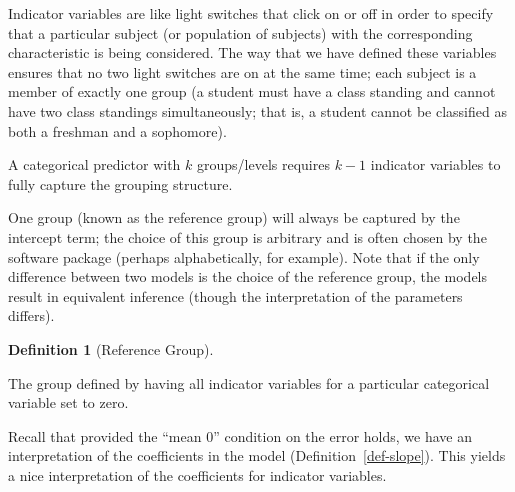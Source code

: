 \documentclass[
  letterpaper,
  DIV=11,
  numbers=noendperiod]{scrreprt}
\theoremstyle{definition}
\newtheorem{definition}{Definition}[chapter]
\theoremstyle{definition}
\theoremstyle{remark}
\begin{document}
Indicator variables are like light switches that click on or off in
order to specify that a particular subject (or population of subjects)
with the corresponding characteristic is being considered. The way that
we have defined these variables ensures that no two light switches are
on at the same time; each subject is a member of exactly one group (a
student must have a class standing and cannot have two class standings
simultaneously; that is, a student cannot be classified as both a
freshman and a sophomore).

\begin{tcolorbox}[enhanced jigsaw, left=2mm, toprule=.15mm, arc=.35mm, breakable, opacitybacktitle=0.6, opacityback=0, rightrule=.15mm, colbacktitle=quarto-callout-note-color!10!white, coltitle=black, leftrule=.75mm, toptitle=1mm, colframe=quarto-callout-note-color-frame, titlerule=0mm, title=\textcolor{quarto-callout-note-color}{\faInfo}\hspace{0.5em}{Note}, bottomrule=.15mm, colback=white, bottomtitle=1mm]

A categorical predictor with \(k\) groups/levels requires \(k-1\)
indicator variables to fully capture the grouping structure.

\end{tcolorbox}

One group (known as the reference group) will always be captured by the
intercept term; the choice of this group is arbitrary and is often
chosen by the software package (perhaps alphabetically, for example).
Note that if the only difference between two models is the choice of the
reference group, the models result in equivalent inference (though the
interpretation of the parameters differs).

\begin{definition}[Reference
Group]\protect\hypertarget{def-reference-group}{}\label{def-reference-group}

The group defined by having all indicator variables for a particular
categorical variable set to zero.

\end{definition}

Recall that provided the ``mean 0'' condition on the error holds, we
have an interpretation of the coefficients in the model
(Definition~\ref{def-slope}). This yields a nice interpretation of the
coefficients for indicator variables.
\end{document}
